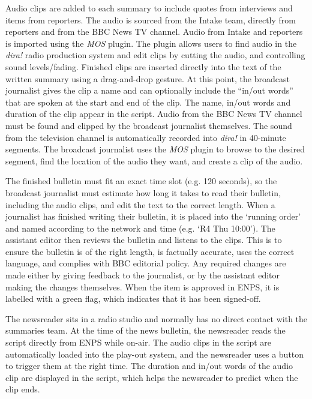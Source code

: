 Audio clips are added to each summary to include quotes from interviews and items from reporters. The audio is sourced
from the Intake team, directly from reporters and from the BBC News TV channel. Audio from Intake and reporters is
imported using the \textit{MOS} plugin. The plugin allows users to find audio in the \textit{dira!} radio production system
and edit clips by cutting the audio, and controlling sound levels/fading. Finished clips are inserted directly into the
text of the written summary using a drag-and-drop gesture. At this point, the broadcast journalist gives the clip a
name and can optionally include the ``in/out words'' that are spoken at the start and end of the clip.  The name,
in/out words and duration of the clip appear in the script.  Audio from the BBC News TV channel must be found and
clipped by the broadcast journalist themselves. The sound from the television channel is automatically recorded into
\textit{dira!} in 40-minute segments. The broadcast journalist uses the \textit{MOS} plugin to browse to the desired
segment, find the location of the audio they want, and create a clip of the audio.

The finished bulletin must fit an exact time slot (e.g. 120 seconds), so the broadcast journalist must estimate how
long it takes to read their bulletin, including the audio clips, and edit the text to the correct length.  When a
journalist has finished writing their bulletin, it is placed into the `running order' and named according to the
network and time (e.g. `R4 Thu 10:00').  The assistant editor then reviews the bulletin and listens to the clips. This
is to ensure the bulletin is of the right length, is factually accurate, uses the correct language, and complies with
BBC editorial policy. Any required changes are made either by giving feedback to the journalist, or by the assistant
editor making the changes themselves.  When the item is approved in ENPS, it is labelled with a green flag, which
indicates that it has been signed-off.

The newsreader sits in a radio studio and normally has no direct contact with the summaries team.  At the time of the
news bulletin, the newsreader reads the script directly from ENPS while on-air. The audio clips in the script are
automatically loaded into the play-out system, and the newsreader uses a button to trigger them at the right time.  The
duration and in/out words of the audio clip are displayed in the script, which helps the newsreader to predict when the
clip ends.

